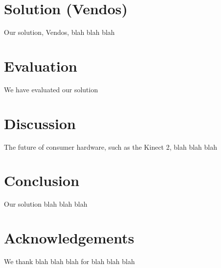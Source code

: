 \documentclass{chi-ext}
\begin{document}
\section{Solution (Vendos)}

Our solution, Vendos, blah blah blah

\section{Evaluation}

We have evaluated our solution

\section{Discussion}

The future of consumer hardware, such as the Kinect 2, blah blah blah

\section{Conclusion}

Our solution blah blah blah


\section{Acknowledgements}

We thank blah blah blah for blah blah blah

\balance


\end{document}
